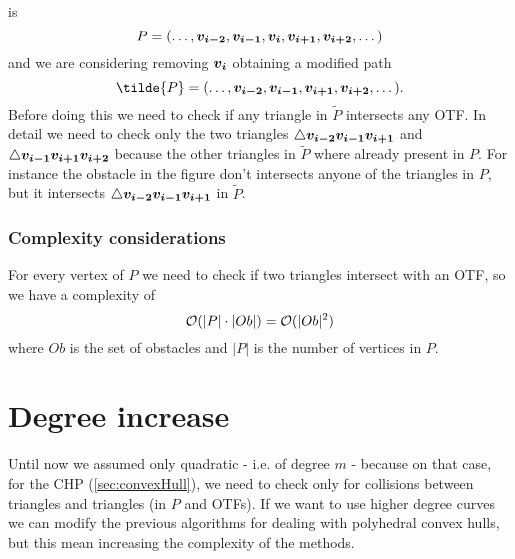 \documentclass[dissertation.tex]{subfiles}
\begin{document}
is
\begin{equation*}
  P=(\dots,\boldsymbol{v_{i-2}},\boldsymbol{v_{i-1}},\boldsymbol{v_{i}},\boldsymbol{v_{i+1}},\boldsymbol{v_{i+2}},\dots)
\end{equation*}
and we are
considering removing $\boldsymbol{v_i}$ obtaining a modified path
\begin{equation*}
  \tilde{P}=(\dots,\ve{v_{i-2}},\ve{v_{i-1}},\ve{v_{i+1}},\ve{v_{i+2}},\dots).
\end{equation*}
Before doing this we need to check if any triangle in $\tilde{P}$
intersects any \ac{OTF}. In detail we need to check only the two
triangles $\triangle\boldsymbol{v_{i-2}}\boldsymbol{v_{i-1}}\boldsymbol{v_{i+1}}$ and
$\triangle\boldsymbol{v_{i-1}}\boldsymbol{v_{i+1}}\boldsymbol{v_{i+2}}$ because the other
triangles in $\tilde{P}$ where already present in $P$. For instance
the obstacle in the figure don't intersects anyone of the triangles in
$P$, but it intersects $\triangle\boldsymbol{v_{i-2}}\boldsymbol{v_{i-1}}\boldsymbol{v_{i+1}}$ in
$\tilde{P}$.

\subsubsection{Complexity considerations}
For every vertex of $P$ we need to check if two triangles intersect
with an \ac{OTF}, so we have a complexity of
\begin{equation*}
  \mathcal{O}(|P|\cdot|Ob|)=\mathcal{O}(|Ob|^2)
\end{equation*}
where $Ob$ is the set of obstacles and $|P|$ is the number of vertices
in $P$.

\section{Degree increase}\label{sec:degreeInc}
Until now we assumed only quadratic \bss{} - i.e. of degree $m$ - because
on that case,
for the \ac{CHP} (\cref{sec:convexHull}),
we need to check only for collisions between triangles and triangles
(in $P$ and \acp{OTF}). If we want to use higher degree
curves we can modify the
previous algorithms for dealing with polyhedral convex hulls, but this
mean increasing the complexity of the methods.
\end{document}
